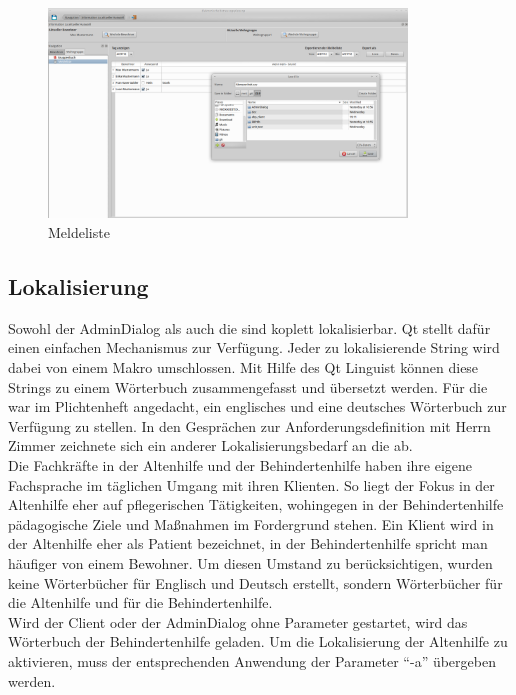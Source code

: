 \begin{itemize}
	\begin{figure}[h]
		\begin{center}
			\includegraphics[keepaspectratio=true, width=0.85\textwidth]{pics/client_meldeliste.png}
			\caption{Meldeliste}
		\end{center}
	\end{figure}
	\FloatBarrier
\end{itemize}
\newpage
\subsection{Lokalisierung}
Sowohl der AdminDialog als auch die \EBP sind koplett lokalisierbar. Qt stellt dafür einen einfachen Mechanismus zur Verfügung. Jeder zu
lokalisierende String wird dabei von einem Makro umschlossen. Mit Hilfe des Qt Linguist können diese Strings zu einem Wörterbuch zusammengefasst und
übersetzt werden. Für die \EBP war im Plichtenheft angedacht, ein englisches und eine deutsches Wörterbuch zur Verfügung zu stellen. In den
Gesprächen zur Anforderungsdefinition mit Herrn Zimmer zeichnete sich ein anderer Lokalisierungsbedarf an die \EBP ab.\\
Die Fachkräfte in der Altenhilfe und der Behindertenhilfe haben ihre eigene Fachsprache im täglichen Umgang mit ihren Klienten. So liegt der Fokus in
der Altenhilfe eher auf pflegerischen Tätigkeiten, wohingegen in der Behindertenhilfe pädagogische Ziele und Maßnahmen im Fordergrund stehen. Ein
Klient wird in der Altenhilfe eher als Patient bezeichnet, in der Behindertenhilfe spricht man häufiger von einem Bewohner. Um diesen Umstand zu
berücksichtigen, wurden keine Wörterbücher für Englisch und Deutsch erstellt, sondern Wörterbücher für die Altenhilfe und für die Behindertenhilfe.\\
Wird der Client oder der AdminDialog ohne Parameter gestartet, wird das Wörterbuch der Behindertenhilfe geladen. Um die Lokalisierung der Altenhilfe
zu aktivieren, muss der entsprechenden Anwendung der Parameter ``-a'' übergeben werden.

